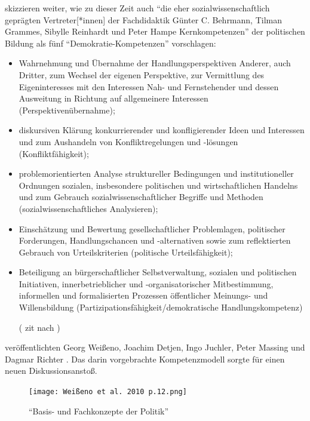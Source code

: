 \textcite[106-107]{Gloe2020} skizzieren weiter, wie zu dieser Zeit auch 
\enquote{die eher sozialwissenschaftlich geprägten Vertreter[*innen] der Fachdidaktik Günter C. Behrmann, Tilman Grammes, Sibylle Reinhardt und Peter Hampe Kernkompetenzen} der politischen Bildung als fünf \enquote{Demokratie-Kompetenzen} vorschlagen:
\begin{itemize}
    \item Wahrnehmung und Übernahme der Handlungsperspektiven Anderer, auch Dritter, zum Wechsel der eigenen Perspektive, zur Vermittlung des Eigeninteresses mit den Interessen Nah- und Fernstehender und dessen Ausweitung in Richtung auf allgemeinere Interessen (Perspektivenübernahme); 
    \item diskursiven Klärung konkurrierender und konfligierender Ideen und Interessen und zum Aushandeln von Konfliktregelungen und -lösungen (Konfliktfähigkeit); 
    \item problemorientierten Analyse struktureller Bedingungen und institutioneller Ordnungen sozialen, insbesondere politischen und wirtschaftlichen Handelns und zum Gebrauch sozialwissenschaftlicher Begriffe und Methoden (sozialwissenschaftliches Analysieren); 
    \item Einschätzung und Bewertung gesellschaftlicher Problemlagen, politischer Forderungen, Handlungschancen und -alternativen sowie zum reflektierten Gebrauch von Urteilskriterien (politische Urteilsfähigkeit); 
    \item Beteiligung an bürgerschaftlicher Selbstverwaltung, sozialen und politischen Initiativen, innerbetrieblicher und -organisatorischer Mitbestimmung, informellen und formalisierten Prozessen öffentlicher Meinungs- und Willensbildung (Partizipationsfähigkeit/demokratische Handlungskompetenz) 

    (\textcite[337 f.]{Behrmann.2004} \gls{zit} nach \textcite[106-107]{Gloe2020})
\end{itemize}
\citeyear{weißeno.2010} veröffentlichten Georg Weißeno, Joachim Detjen, Ingo Juchler, Peter Massing und Dagmar Richter . Das darin vorgebrachte Kompetenzmodell %
sorgte für einen neuen Diskussionsanstoß. 
\begin{figure}[htb]
    \centering
    \texttt{[image: Weißeno et al. 2010 p.12.png]}
    \caption{\enquote{Basis- und Fachkonzepte der Politik} \autocite[12]{weißeno.2010}}
    \label{2010kompMod}
\end{figure}
